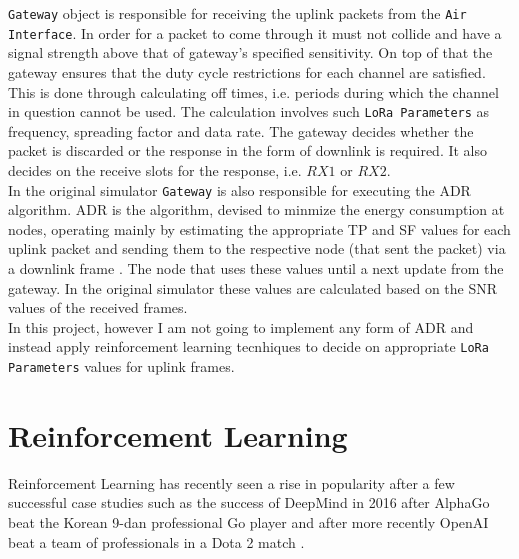 \texttt{Gateway} object is responsible for receiving 
the uplink packets from the \texttt{Air Interface}. In order for a packet to come through it must not collide and have  a signal strength above that of gateway's specified sensitivity. On top of that the gateway ensures that the duty cycle restrictions for each channel are satisfied. This is done through
calculating off times, i.e. periods during which the 
channel in question cannot be used. The calculation
involves such \texttt{LoRa Parameters} as frequency,
spreading factor and data rate. The gateway decides 
whether the packet is discarded or the response in 
the form of downlink is required. It also decides on the
receive slots for the response, i.e. $RX1$ or $RX2$.\\

In the original simulator \cite{simulator} \texttt{Gateway} is also responsible for executing the ADR algorithm. ADR is the algorithm, devised to minmize the energy consumption at nodes, operating mainly by estimating the appropriate TP and SF values for each uplink packet and sending them to the respective node (that sent the packet) via a downlink frame \cite{simulator}. The node that uses these values until a next update from the gateway. In the original simulator these values are calculated based on the SNR values of the received frames. \\

In this project, however I am not going to implement any form of ADR and instead apply reinforcement learning tecnhiques to 
decide on appropriate \texttt{LoRa Parameters} values for uplink frames.\\


\chapter{Reinforcement Learning} 

Reinforcement Learning has recently seen a rise in popularity after a few successful case studies such as the success of DeepMind in 2016 after AlphaGo beat the Korean 9-dan professional Go player \cite{alpha_go_lee_sedol} and after more recently OpenAI beat a team of professionals in a Dota 2 match \cite{dota}.\\

